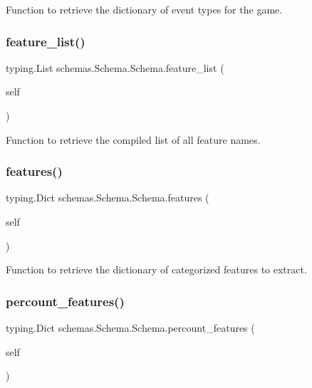 Function to retrieve the dictionary of event types for the game. 

\mbox{\label{classschemas_1_1_schema_1_1_schema_ac787b75fe46e2bbe10fd807bf76e1d0e}} 
\subsubsection{\texorpdfstring{feature\_list()}{feature\_list()}}
{\footnotesize\ttfamily  typing.\+List schemas.\+Schema.\+Schema.\+feature\+\_\+list (\begin{DoxyParamCaption}\item[{}]{self }\end{DoxyParamCaption})}



Function to retrieve the compiled list of all feature names. 

\mbox{\label{classschemas_1_1_schema_1_1_schema_af82bbbdcbfcce5c877835fb72f011fd8}} 
\subsubsection{\texorpdfstring{features()}{features()}}
{\footnotesize\ttfamily  typing.\+Dict schemas.\+Schema.\+Schema.\+features (\begin{DoxyParamCaption}\item[{}]{self }\end{DoxyParamCaption})}



Function to retrieve the dictionary of categorized features to extract. 

\mbox{\label{classschemas_1_1_schema_1_1_schema_a9c47728a54d6f61550c665d83ecf142a}} 
\subsubsection{\texorpdfstring{percount\_features()}{percount\_features()}}
{\footnotesize\ttfamily  typing.\+Dict schemas.\+Schema.\+Schema.\+percount\+\_\+features (\begin{DoxyParamCaption}\item[{}]{self }\end{DoxyParamCaption})}



